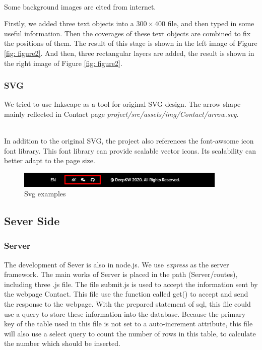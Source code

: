 \documentclass{article}
\begin{document}
~\\
\noindent
Some background images are cited from internet.

\noindent
Firstly, we added three text objects into a $ 300 \times 400 $ file, and then 
typed in some useful information. Then the coverages of these text objects are
combined to fix the positions of them. The result of this stage is shown in the 
left image of Figure \ref{fig: figure2}. And then, three rectangular layers are 
added, the result is shown in the right image of Figure \ref{fig: figure2}. 



\subsubsection{SVG}
We tried to use Inkscape as a tool for original SVG design. 
The arrow shape mainly reflected in Contact page 
\textit{project/src/assets/img/Contact/arrow.svg}.

~\\
\noindent
In addition to the original SVG, the project also references the 
font-awsome icon font library. This font library can provide 
scalable vector icons. Its scalability can better adapt to the page size.
\begin{figure}[h]
    \centering
    \includegraphics[width=10cm]{img/exp/svg.png}
    \caption{Svg examples}
    \label{}
\end{figure}

\subsection{Sever Side}
\subsubsection{Server}
The development of Sever is also in node.js. We use \textit{express} as the 
server framework. The main works of Server is placed in the path (Server/routes),
including three .js file. The file submit.js is used to accept the information 
sent by the webpage Contact. This file use the function called get() to accept and 
send the response to the webpage. With the prepared statement of sql, this file 
could use a query to store these information into the database. Because the primary
key of the table used in this file is not set to a auto-increment attribute, this
file will also use a select query to count the number of rows in this table, to 
calculate the number which should be inserted.
\end{document}
